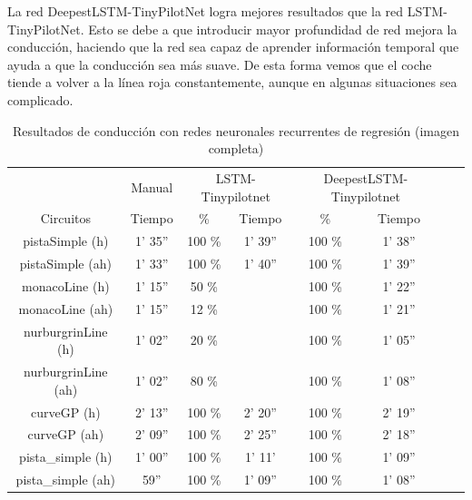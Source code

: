 La red DeepestLSTM-TinyPilotNet logra mejores resultados que la red LSTM-TinyPilotNet. Esto se debe a que introducir mayor profundidad de red mejora la conducción, haciendo que la red sea capaz de aprender información temporal que ayuda a que la conducción sea más suave. De esta forma vemos que el coche tiende a volver a la línea roja constantemente, aunque en algunas situaciones sea complicado. \\


\begin{table}[H]
\centering
\caption{Resultados de conducción con redes neuronales recurrentes de regresión (imagen completa)}
\label{resultados_regresion_recurrente_completa}
\begin{tabular}{c|c|c|c|c|c|c|c|}
\cline{2-6}
                          & \multicolumn{1}{c|}{Manual} & \multicolumn{2}{c|}{LSTM-Tinypilotnet} & \multicolumn{2}{c|}{DeepestLSTM-Tinypilotnet} \\ \cline{1-6} 
                        \multicolumn{1}{|c|}{Circuitos}    & Tiempo       & \%       & Tiempo       & \%        & Tiempo      \\ \hline
\multicolumn{1}{|c|}{pistaSimple (h)}    & 1' 35''     & 100 \%  & 1' 39''    & 100 \%  & 1' 38''         \\ \hline
\multicolumn{1}{|c|}{pistaSimple (ah)}     & 1' 33''   & 100 \%        & 1' 40''        & 100 \%     & 1' 39''   \\ \hline
\multicolumn{1}{|c|}{monacoLine (h)}      & 1' 15''      & 50 \%        &        & 100 \%       & 1' 22''           \\ \hline
\multicolumn{1}{|c|}{monacoLine (ah)}       & 1' 15''       & 12 \%       &         & 100 \%          & 1' 21''        \\ \hline
\multicolumn{1}{|c|}{nurburgrinLine (h)}      & 1' 02''       & 20 \%     &       & 100 \%     & 1' 05''       \\ \hline
\multicolumn{1}{|c|}{nurburgrinLine (ah)}       & 1' 02''     & 80 \%     &        & 100 \%     & 1' 08''         \\ \hline
\multicolumn{1}{|c|}{curveGP (h)}     & 2' 13''     & 100 \%     & 2' 20''     & 100 \%      & 2' 19''             \\ \hline
\multicolumn{1}{|c|}{curveGP (ah)}       & 2' 09''       & 100 \%    & 2' 25''     & 100 \%       & 2' 18''      \\ \hline
\multicolumn{1}{|c|}{pista\_simple (h)}       & 1' 00''    & 100 \%      & 1' 11'      & 100 \%      & 1' 09''    \\ \hline
\multicolumn{1}{|c|}{pista\_simple (ah)}     & 59''    & 100 \%    & 1' 09''    &  100 \%      & 1' 08''          \\ \hline
\end{tabular}
\end{table}



